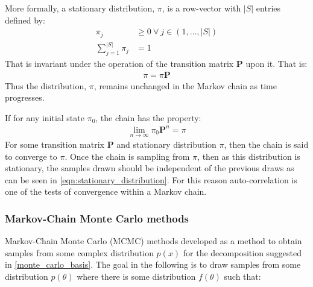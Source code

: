 \documentclass[14pt]{extarticle} %
\begin{document}
More formally, a stationary distribution, $\pi$, is a row-vector with $|S|$ entries defined by:
\begin{align}
\pi_j &\geq 0 \: \forall \: j \in (1,\ldots,|S|) \\
\sum_{j=1}^{|S|}\pi_j &= 1
\end{align}
That is invariant under the operation of the transition matrix $\mathbf{P}$ upon it. That is:
\begin{align} \label{eqn:stationary_distribution}
\pi = \pi\mathbf{P}
\end{align}
Thus the distribution, $\pi$, remains unchanged in the Markov chain as time progresses.

If for any initial state $\pi_0$, the chain has the property:
\begin{align}
\lim_{n\to\infty} \pi_0 \mathbf{P}^n = \pi
\end{align}
For some transition matrix $\mathbf{P}$ and stationary distribution $\pi$, then the chain is said to converge to $\pi$. Once the chain is sampling from $\pi$, then as this distribution is stationary, the samples drawn should be independent of the previous draws as can be seen in \eqref{eqn:stationary_distribution}. For this reason auto-correlation is one of the tests of convergence within a Markov chain.


\subsubsection{Markov-Chain Monte Carlo methods}
Markov-Chain Monte Carlo (MCMC) methods developed as a method to obtain samples from some complex distribution $p(x)$ for the decomposition suggested in \eqref{monte_carlo_basis}. The goal in the following is to draw samples from some distribution $p(\theta)$ where there is some distribution $f(\theta)$ such that:
\end{document}
